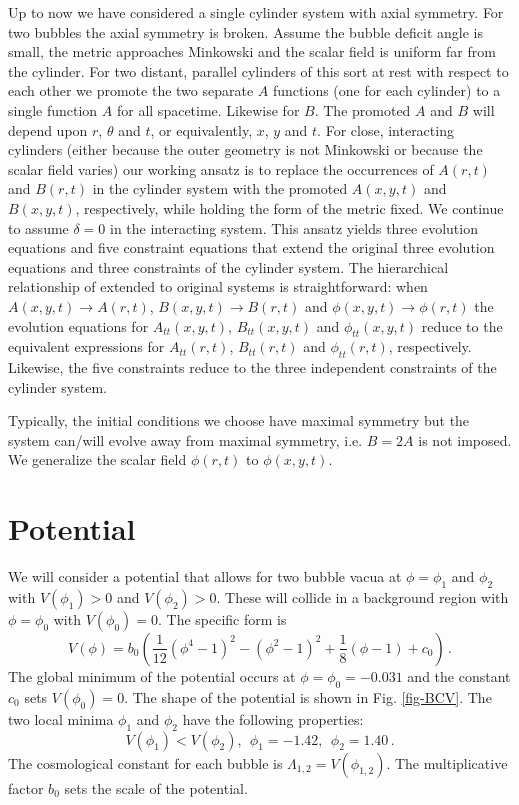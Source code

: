 \documentclass[preprintnumbers,eqsecnum,aps,prd,epsf,showpacs,nofootinbib
]{revtex4}
\begin{document}
Up to now we have considered a single cylinder system with axial
symmetry.  For two bubbles the axial symmetry is broken.  Assume the
bubble deficit angle is small, the metric approaches Minkowski and the
scalar field is uniform far from the cylinder.  For two distant,
parallel cylinders of this sort at rest with respect to each other we
promote the two separate $A$ functions (one for each cylinder) to a
single function $A$ for all spacetime.  Likewise for $B$.  The
promoted $A$ and $B$ will depend upon $r$, $\theta$ and $t$, or
equivalently, $x$, $y$ and $t$. For close, interacting cylinders
(either because the outer geometry is not Minkowski or because the
scalar field varies) our working ansatz is to replace the occurrences
of $A(r,t)$ and $B(r,t)$ in the cylinder system with the promoted
$A(x,y,t)$ and $B(x,y,t)$, respectively, while holding the form of the
metric fixed. We continue to assume $\delta = 0$ in the interacting
system.  This ansatz yields three evolution equations and five
constraint equations that extend the original three evolution
equations and three constraints of the cylinder system.  The
hierarchical relationship of extended to original systems is
straightforward: when $A(x,y,t) \to A(r,t)$, $B(x,y,t) \to B(r,t)$ and
$\phi(x,y,t) \to \phi(r,t)$ the evolution equations for
$A_{tt}(x,y,t)$, $B_{tt}(x,y,t)$ and $\phi_{tt}(x,y,t)$ reduce to the
equivalent expressions for $A_{tt}(r,t)$, $B_{tt}(r,t)$ and
$\phi_{tt}(r,t)$, respectively. Likewise, the five constraints reduce
to the three independent constraints of the cylinder system.

Typically, the initial conditions we choose have maximal symmetry but
the system can/will evolve away from maximal symmetry, i.e. $B=2A$
is not imposed.  We generalize the scalar field $\phi(r,t)$ to $\phi(x,y,t)$.

\section{Potential}

We will consider a potential that allows for two bubble vacua at
$\phi=\phi_1$ and $\phi_2$ with $V(\phi_1)>0$ and $V(\phi_2)>0$. These
will collide in a background
region with $\phi=\phi_0$ with $V(\phi_0)=0$. The specific form is
\begin{equation}
V(\phi)=b_0\left({\frac{1}{12}}(\phi^4-1)^2-(\phi^2-1)^2+{\frac{1}{8}}(\phi-1)+c_0\right)\,.
\end{equation}
The global minimum of the potential occurs at $\phi=\phi_0=-0.031$ and
the constant $c_0$ sets $V(\phi_0)=0$. The shape of the potential is
shown in Fig. \ref{fig-BCV}. The two local minima $\phi_1$ and
$\phi_2$ have the following properties:
\begin{equation}
V(\phi_1)<V(\phi_2),~~ \phi_1=-1.42,~~\phi_2=1.40\,.
\end{equation}
The cosmological constant for each bubble is
$\Lambda_{1,2}=V(\phi_{1,2})$.  The multiplicative factor $b_0$ sets
the scale of the potential.
\end{document}
